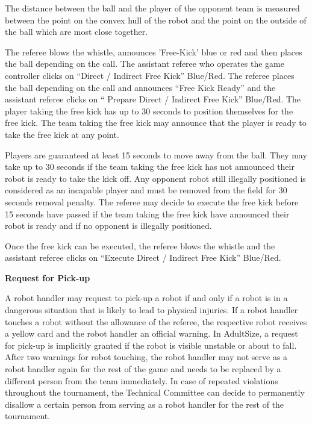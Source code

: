 The distance between the ball and the player of the opponent team is measured between the point on the convex hull of the robot and the point on the outside of the ball which are most close together.

\color{black}


The referee blows the whistle, announces 'Free-Kick' blue or red and then places
the ball depending on the call.
The assistant referee who operates the game controller clicks on
``Direct / Indirect Free Kick'' Blue/Red.
The referee places the ball depending on the call and announces
``Free Kick Ready'' and the assistant referee clicks on
`` Prepare Direct / Indirect Free Kick'' Blue/Red.
The player taking the free kick has up to 30 seconds to position themselves for
the free kick.
The team taking the free kick may announce that the player is ready to take the
free kick at any point.

Players are guaranteed at least 15 seconds to move away from the ball.
They may take up to 30 seconds if the team taking the free kick has not announced
their robot is ready to take the kick off.
Any opponent robot still illegally positioned is considered as an incapable
player and must be removed from the field for 30 seconds removal penalty.
The referee may decide to execute the free kick before 15 seconds have passed if
the team taking the free kick have announced their robot is ready and if no
opponent is illegally positioned.

Once the free kick can be executed, the referee blows the whistle and the
assistant referee clicks on ``Execute Direct / Indirect Free Kick'' Blue/Red.


\bigskip


{\bfseries Request for Pick-up}

A robot handler may request to pick-up a robot if and only if a robot is in a
dangerous situation that is likely to lead to physical injuries.
If a robot handler touches a robot without the allowance of the referee,
the respective robot receives a yellow card and the robot handler an official warning.
In AdultSize, a request for pick-up is implicitly granted if the robot is
visible unstable or about to fall.
After two warnings for robot touching, the robot handler may not serve as a
robot handler again for the rest of the game and needs to be replaced by a
different person from the team immediately.
In case of repeated violations throughout the tournament, the Technical
Committee can decide to permanently disallow a certain person from serving as
a robot handler for the rest of the tournament.

